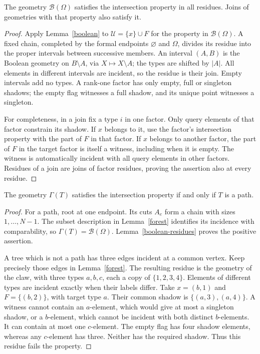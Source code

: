 \begin{lemma}\label{boolean-residues}
The geometry $\mathcal B(\Omega)$ satisfies the intersection property
in all residues. Joins of geometries with that property also satisfy it.
\end{lemma}
\begin{proof}
Apply Lemma~\ref{boolean} to $\mathcal U=\{x\}\cup F$ for the property
in $\mathcal B(\Omega)$. A fixed chain, completed by the formal endpoints
$\varnothing$ and $\Omega$, divides its residue into the proper intervals
between successive members. An interval $(A,B)$ is the Boolean geometry
on $B\setminus A$, via $X\mapsto X\setminus A$; the types are shifted
by $|A|$. All elements in different intervals are incident, so the residue
is their join. Empty intervals add no types. A rank-one factor has only
empty, full or singleton shadows; the empty flag witnesses a full
shadow, and its unique point witnesses a singleton.

For completeness, in a join fix a type $i$ in one factor. Only query
elements of that factor constrain its shadow. If $x$ belongs to it, use
the factor's intersection property with the part of $F$ in that factor.
If $x$ belongs to another factor, the part of $F$ in the target factor
is itself a witness, including when it is empty. The witness is
automatically incident with all query elements in other factors.
Residues of a join are joins of factor residues, proving the assertion
also at every residue.
\end{proof}

\begin{theorem}\label{path}
The geometry $\Gamma(T)$ satisfies the intersection property if and only
if $T$ is a path.
\end{theorem}
\begin{proof}
For a path, root at one endpoint. Its cuts $A_e$ form a chain with sizes
$1,\ldots,N-1$. The subset description in Lemma~\ref{forest} identifies
its incidence with comparability, so $\Gamma(T)=\mathcal B(\Omega)$.
Lemma~\ref{boolean-residues} proves the positive assertion.

A tree which is not a path has three edges incident at a common vertex.
Keep precisely those edges in Lemma~\ref{forest}. The resulting residue
is the geometry of the claw, with three types $a,b,c$, each a copy of
$\{1,2,3,4\}$. Elements of different types are incident exactly when
their labels differ. Take $x=(b,1)$ and $F=\{(b,2)\}$, with target
type $a$. Their common shadow is $\{(a,3),(a,4)\}$. A witness cannot
contain an $a$-element, which would give at most a singleton shadow,
or a $b$-element, which cannot be incident with both distinct
$b$-elements. It can contain at most one $c$-element. The empty flag
has four shadow elements, whereas any $c$-element has three. Neither
has the required shadow. Thus this residue fails the property.
\end{proof}

